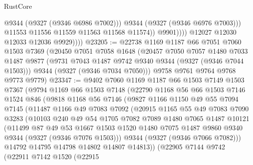 \begin{lexlean}{RustCore}
\begin{coremodule}
                            @9344
                            (@9327 (@9346 @6986 @7002)))
                          @9344
                          (@9327 (@9346 @6976 @7003)))
                        @11553
                        @11556
                        @11559
                        @11563
                        @11568
                        @11574))
                    @9901))))
            @12027
            @12030
            @12033
            @12036
            @9929))))
@23205 := @22738
    @1169
    @1187
    @66
    @7051
    @7060
    @1503
    @7369
    (@20450
      @7051
      @7058
      @1648
      (@20457
        @7050
        @7057
        @1480
        @7033
        @1487
        @9877
        (@9731 @7043 @1487 @9742 @9340 @9344 (@9327 (@9346 @7044 @1503)))
        @9344
        (@9327 (@9346 @7034 @7050)))
      @9758
      @9761
      @9764
      @9768
      @9773
      @9779)
@23347 := @9402
    @7060
    @1169
    @1187
    @66
    @1503
    @7149
    @1503
    @7367
    (@9794
      @1169
      @66
      @1503
      @7148
      (@22790
        @1168
        @56
        @66
        @1503
        @7146
        @1524
        @846
        (@9818
          @1168
          @56
          @7146
          (@9827
            @1166
            @1150
            @49
            @55
            @7094
            @7145
            (@11487
              @1166
              @49
              @7083
              @7092
              (@20915
                @1165
                @55
                @49
                @7083
                @7090
                @3283
                (@10103
                  @240
                  @49
                  @54
                  @1705
                  @7082
                  @7089
                  @1480
                  @7065
                  @1487
                  @10121
                  (@11499
                    @87
                    @49
                    @53
                    @1667
                    @1503
                    @1520
                    @1480
                    @7075
                    @1487
                    @9860
                    @9340
                    @9344
                    (@9327 (@9346 @7076 @1503)))
                  @9344
                  (@9327 (@9346 @7066 @7082)))
                @14792
                @14795
                @14798
                @14802
                @14807
                @14813))
            (@22905
              @7144
              @9742
              (@22911
                @7142
                @1520
                (@22915

\end{coremodule}
\end{lexlean}
